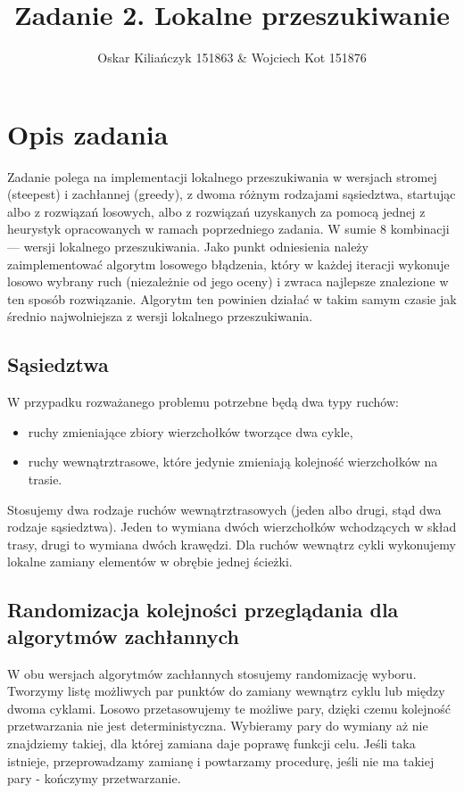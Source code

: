\documentclass[11pt]{article}
\title{Zadanie 2. Lokalne przeszukiwanie}
\author{Oskar Kiliańczyk 151863 \& Wojciech Kot 151876}
\date{}
\begin{document}
\maketitle
\newpage

\section{Opis zadania}\label{sec:opis-zadania}
Zadanie polega na implementacji lokalnego przeszukiwania w wersjach stromej (steepest) i zachłannej (greedy), z dwoma różnym rodzajami sąsiedztwa, startując albo z rozwiązań losowych, albo z rozwiązań uzyskanych za pomocą jednej z heurystyk opracowanych w ramach poprzedniego zadania.
W sumie 8 kombinacji --- wersji lokalnego przeszukiwania.
Jako punkt odniesienia należy zaimplementować algorytm losowego błądzenia, który w każdej iteracji wykonuje losowo wybrany ruch (niezależnie od jego oceny) i zwraca najlepsze znalezione w ten sposób rozwiązanie.
Algorytm ten powinien działać w takim samym czasie jak średnio najwolniejsza z wersji lokalnego przeszukiwania.

\subsection{Sąsiedztwa}\label{subsec:sasiedztwa}
W przypadku rozważanego problemu potrzebne będą dwa typy ruchów:
\begin{itemize}
\item ruchy zmieniające zbiory wierzchołków tworzące dwa cykle,
\item ruchy wewnątrztrasowe, które jedynie zmieniają kolejność wierzchołków na trasie.
\end{itemize}
Stosujemy dwa rodzaje ruchów wewnątrztrasowych (jeden albo drugi, stąd dwa rodzaje sąsiedztwa).
Jeden to wymiana dwóch wierzchołków wchodzących w skład trasy, drugi to wymiana dwóch krawędzi.
Dla ruchów wewnątrz cykli wykonujemy lokalne zamiany elementów w obrębie jednej ścieżki.

\subsection{Randomizacja kolejności przeglądania dla algorytmów zachłannych}\label{subsec:randomizacja-kolejnosci-przegladania-dla-algorytmow-zachannych}
W obu wersjach algorytmów zachłannych stosujemy randomizację wyboru.
Tworzymy listę możliwych par punktów do zamiany wewnątrz cyklu lub między dwoma cyklami.
Losowo przetasowujemy te możliwe pary, dzięki czemu kolejność przetwarzania nie jest deterministyczna.
Wybieramy pary do wymiany aż nie znajdziemy takiej, dla której zamiana daje poprawę funkcji celu.
Jeśli taka istnieje, przeprowadzamy zamianę i powtarzamy procedurę, jeśli nie ma takiej pary - kończymy przetwarzanie.
\end{document}
